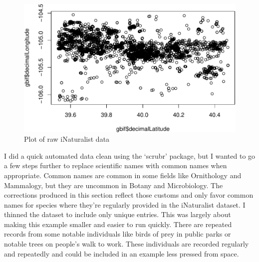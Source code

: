 \documentclass[
]{article}
\newenvironment{Shaded}{\begin{snugshade}}{\end{snugshade}}
\newcommand{\CommentTok}[1]{\textcolor[rgb]{0.56,0.35,0.01}{\textit{#1}}}
\newcommand{\KeywordTok}[1]{\textcolor[rgb]{0.13,0.29,0.53}{\textbf{#1}}}
\newcommand{\NormalTok}[1]{#1}
\newcommand{\OperatorTok}[1]{\textcolor[rgb]{0.81,0.36,0.00}{\textbf{#1}}}
\newcommand{\StringTok}[1]{\textcolor[rgb]{0.31,0.60,0.02}{#1}}
\begin{document}
\begin{figure}
\centering
\includegraphics{Earth_Lab_application_files/figure-latex/unnamed-chunk-3-1.pdf}
\caption{Plot of raw iNaturalist data}
\end{figure}

I did a quick automated data clean using the `scrubr' package, but I
wanted to go a few steps further to replace scientific names with common
names when appropriate. Common names are common in some fields like
Ornithology and Mammalogy, but they are uncommon in Botany and
Microbiology. The corrections produced in this section reflect those
customs and only favor common names for species where they're regularly
provided in the iNaturalist dataset. I thinned the dataset to include
only unique entries. This was largely about making this example smaller
and easier to run quickly. There are repeated records from some notable
individuals like birds of prey in public parks or notable trees on
people's walk to work. These individuals are recorded regularly and
repeatedly and could be included in an example less pressed from space.

\begin{Shaded}
\end{Shaded}
\end{document}

